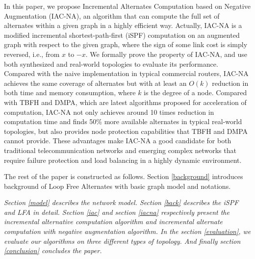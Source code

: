In this paper, we propose Incremental Alternates Computation based on Negative
Augmentation (IAC-NA), an algorithm that can
compute the full set of alternates within a given graph in a highly efficient way.
Actually, IAC-NA is a modified incremental shortest-path-first (iSPF) computation
on an augmented graph with respect to the given graph, where the sign of some link cost
is simply reversed, i.e., from $x$ to $-x$. We formally prove the property of IAC-NA,
and use both synthesized and real-world topologies to evaluate its performance.
Compared with the naive implementation in typical commercial routers, IAC-NA achieves the same coverage of alternates but  
with at least an $O(k)$ reduction in both time and memory consumption, where $k$ is the degree of a node. 
Compared with TBFH and DMPA, which are latest algorithms proposed for acceleration of computation, 
IAC-NA not only achieves around 10 times reduction in computation time 
and finds 50\% more available alternates in typical real-world topologies, but also 
provides  node protection capabilities that TBFH and DMPA cannot provide.
These advantages make IAC-NA a good candidate for both traditional telecommunication networks
and emerging complex networks that require failure protection and load balancing
in a highly dynamic environment.
\iffalse
Our contributions are summarized as follows:
\begin{itemize}
\item We propose an incremental alternates computation (IAC) algorithm based on iSPF, which can compute all the next hops satisfied DC rule. %
\item Theoretical analysis indicates that the computation complexity of IAC is less than that of constructing a shortest path tree and  can provide the same network availability as DC.
\item We propose an IAC-NA algorithm which can  efficiently calculate
the minimum cost of all its neighbors to all other nodes of the
network on the shortest path tree rooted at the compute node. Therefore
IAC-NA can completely and efficiently deal with LFA problem.
\item Theoretical analysis and experiments results indicate that IAC-NA can provide the same network availability as LFA.
\end{itemize}
\fi

The rest of the paper is constructed as follows. 
Section \ref{background} introduces background of Loop Free Alternates with basic graph model and notations.

{\em Section \ref{model}  describes the network model.
Section \ref{back} describes the iSPF and LFA in detail.
Section \ref{iac} and section \ref{iacna} respectively present the incremental alternative computation algorithm and incremental alternate computation with negative augmentation algorithm.
In the section \ref{evaluation}, we evaluate our algorithms on three different types of topology.  And finally section \ref{conclusion} concludes the paper.
}



